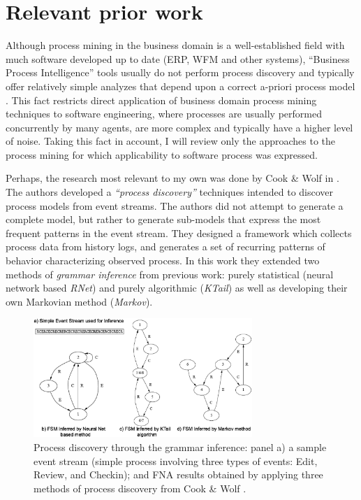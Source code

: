 \documentclass{sig-alternate}
\begin{document}
\section{Relevant prior work}
Although process mining in the business domain is a well-established field with much software developed up to date (ERP, WFM and other systems), ``Business Process Intelligence'' tools usually do not perform process discovery and typically offer relatively simple analyzes that depend upon a correct a-priori process model \cite{citeulike:2678511} \cite{citeulike:3718014} \cite{citeulike:5044991}. This fact restricts direct application of business domain process mining techniques to software engineering, where processes are usually performed concurrently by many agents, are more complex and typically have a higher level of noise. Taking this fact in account, I will review only the approaches to the process mining for which applicability to software process was expressed. 

Perhaps, the research most relevant to my own was done by Cook \& Wolf in \cite{citeulike:328044}. The authors developed a \textit{``process discovery''} techniques intended to discover process models from event streams. The authors did not attempt to generate a complete model, but rather to generate sub-models that express the most frequent patterns in the event stream. They designed a framework which collects process data from history logs, and generates a set of recurring patterns of behavior characterizing observed process. In this work they extended two methods of \textit{grammar inference} from previous work: purely statistical (neural network based \textit{RNet}) and purely algorithmic (\textit{KTail}) as well as developing their own Markovian method (\textit{Markov}). 

\begin{figure}[tbp]
   \centering
   \includegraphics[height=45mm]{inference.eps}
   \caption{Process discovery through the grammar inference: panel a) a sample event stream (simple process involving three types of events: Edit, Review, and Checkin); and FNA results obtained by applying three methods of process discovery from Cook \& Wolf \cite{citeulike:328044}.}
   \label{fig:inference}
\end{figure}
\end{document}
